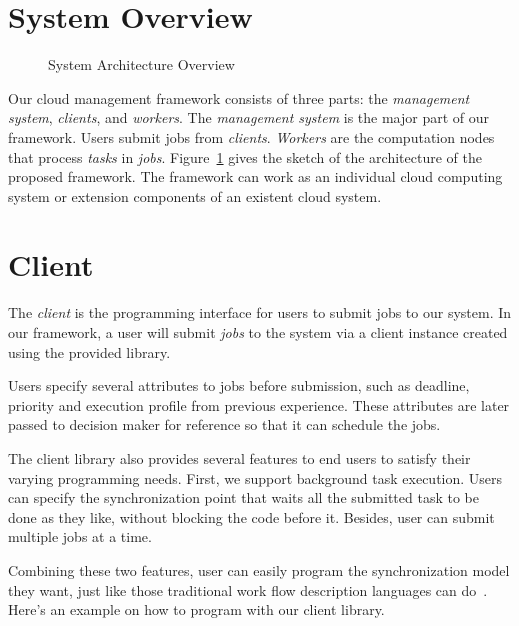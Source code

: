 \section{System Overview}

\begin{figure}[htbp]
\centering

\caption{System Architecture Overview}
\label{fig:archi-overview}
\end{figure}

Our cloud management framework consists of three parts: the \emph{
management system}, \emph{clients}, and \emph{workers}.
The \emph{management system} is the major part of our framework.
Users submit jobs from \emph{clients}.
\emph{Workers} are the computation nodes that process \emph{tasks} in
\emph{jobs}.
Figure~\ref{fig:archi-overview} gives the sketch of the architecture of
the proposed framework.
The framework can work as an individual cloud computing system or
extension components of an existent cloud system.

\section{Client}

The \emph{client} is the programming interface for users to submit jobs
to our system.
In our framework, a user will submit \emph{jobs} to the system via a
client instance created using the provided library.

Users specify several attributes to jobs before submission, such as
deadline, priority and execution profile from previous experience.
These attributes are later passed to decision maker for reference so
that it can schedule the jobs.

The client library also provides several features to end users to
satisfy their varying programming needs.
First, we support background task execution.
Users can specify the synchronization point that waits all the submitted
task to be done as they like, without blocking the code before it.
Besides, user can submit multiple jobs at a time.

Combining these two features, user can easily program the
synchronization model they want, just like those traditional work flow
description languages can do~\cite{cite:workflow-management}.
Here's an example on how to program with our client library.

\begin{Example Code}
  
  \caption{Sample code of client usage}
\end{Example Code}

